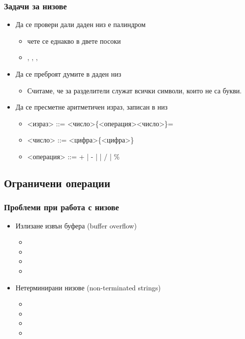 \documentclass{beamer}
\begin{document}
\begin{frame}
  \frametitle{Задачи за низове}

  \begin{itemize}[<+->]
  \item Да се провери дали даден низ е \alert{палиндром}
    \begin{itemize}
    \item чете се еднакво в двете посоки
    \item {}, , , 
    \end{itemize}
  \item Да се преброят думите в даден низ
    \begin{itemize}
    \item Считаме, че за разделители служат всички символи, които не са букви.
    \end{itemize}
  \item Да се пресметне аритметичен израз, записан в низ
    \begin{itemize}
    \item{} <израз> ::= <число>\{<операция><число>\}\tta=
    \item{} <число> ::= <цифра>\{<цифра>\}
    \item{} <операция> ::= \tta+ | \tta- | \tta* | \tta/ | \tta\%
    \end{itemize}
  \end{itemize}
\end{frame}

\subsection{Ограничени операции}

\begin{frame}
  \frametitle{Проблеми при работа с низове}

  \begin{itemize}[<+->]
  \item Излизане извън буфера (buffer overflow)
    \begin{itemize}
    \item {}
    \item {}
    \item {}
    \item {}
    \end{itemize}
  \item Нетерминирани низове (non-terminated strings)
    \begin{itemize}
    \item {}
    \item {}
    \item {}
    \item {}
    \end{itemize}
  \end{itemize}
\end{frame}
\end{document}
